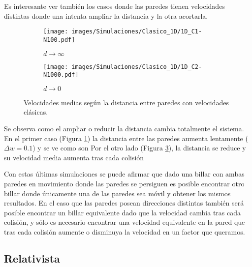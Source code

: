 \vspace{3mm}

Es interesante ver también los casos donde las paredes tienen velocidades distintas donde una intenta ampliar la distancia y la otra acortarla. 

\begin{figure}[H]
    \begin{subfigure}[b]{0.5\textwidth}
        \centering
        \texttt{[image: images/Simulaciones/Clasico\_1D/1D\_C1-N100.pdf]}
        \caption{$d \rightarrow \infty$}
        \label{fig:clasico_distancia_infinito}
    \end{subfigure}
    \hfill
    \begin{subfigure}[b]{0.5\textwidth}
        \centering
        \texttt{[image: images/Simulaciones/Clasico\_1D/1D\_C2-N1000.pdf]}
        \caption{$d \rightarrow 0$}
        \label{fig:clasico_distancia_cero}
    \end{subfigure}
    \caption{Velocidades medias según la distancia entre paredes con velocidades clásicas.}
\end{figure}

Se observa como el ampliar o reducir la distancia cambia totalmente el sistema. En el primer caso (Figura \ref{fig:clasico_distancia_infinito}) la distancia entre las paredes aumenta lentamente (\( \Delta w = 0.1 \)) y se ve como son  Por el otro lado (Figura \ref{fig:clasico_distancia_cero}), la distancia se reduce y su velocidad media aumenta tras cada colisión 

\vspace{3mm}

Con estas últimas simulaciones se puede afirmar que dado una billar con ambas paredes en movimiento donde las paredes se persiguen es posible encontrar otro billar donde únicamente una de las paredes sea móvil y obtener los mismos resultados. En el caso que las paredes posean direcciones distintas también será posible encontrar un billar equivalente dado que la velocidad cambia tras cada colisión, y sólo es necesario encontrar una velocidad equivalente en la pared que tras cada colisión aumente o disminuya la velocidad en un factor que queramos. 

\subsection{Relativista}

